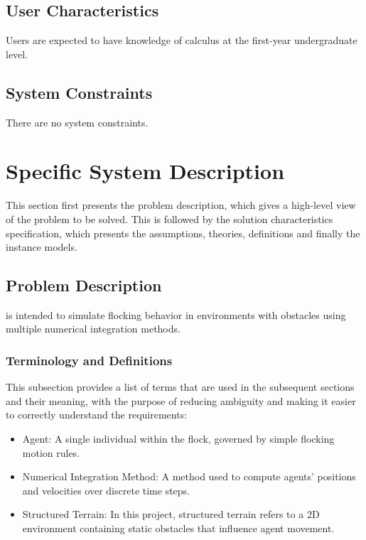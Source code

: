 \documentclass[12pt]{article}
\begin{document}
\subsection{User Characteristics} \label{SecUserCharacteristics}

Users are expected to have knowledge of calculus at the first-year 
undergraduate level.

\subsection{System Constraints}

There are no system constraints.

\section{Specific System Description}

This section first presents the problem description, which gives a high-level
view of the problem to be solved.  This is followed by the solution characteristics
specification, which presents the assumptions, theories, definitions and finally
the instance models.

\subsection{Problem Description} \label{Sec_pd}

\progname{} is intended to simulate flocking behavior in environments with 
obstacles using multiple numerical integration methods.

\subsubsection{Terminology and  Definitions}

This subsection provides a list of terms that are used in the subsequent
sections and their meaning, with the purpose of reducing ambiguity and making it
easier to correctly understand the requirements:

\begin{itemize}

\item Agent: A single individual within the flock, governed by simple flocking 
motion rules.
\item Numerical Integration Method: A method used to compute agents' positions 
and velocities over discrete time steps.
\item Structured Terrain: In this project, structured terrain refers to a 2D 
environment containing static obstacles that influence agent movement.

\end{itemize}
\end{document}
